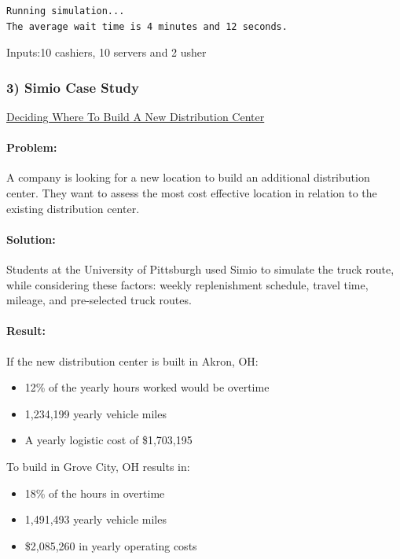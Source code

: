 \documentclass[
  11pt,
]{article}
\let\oldparagraph\paragraph
\renewcommand{\paragraph}[1]{\oldparagraph{#1}\mbox{}}
\begin{document}
\begin{verbatim}
Running simulation... 
The average wait time is 4 minutes and 12 seconds.
\end{verbatim}

Inputs:10 cashiers, 10 servers and 2 usher

\subsubsection{3) Simio Case Study}\label{simio-case-study}

\href{https://www.simio.com/projects/deciding-where-to-build-a-new-distribution-center/}{Deciding
Where To Build A New Distribution Center}

\paragraph{Problem:}\label{problem}

A company is looking for a new location to build an additional
distribution center. They want to assess the most cost effective
location in relation to the existing distribution center.

\paragraph{Solution:}\label{solution}

Students at the University of Pittsburgh used Simio to simulate the
truck route, while considering these factors: weekly replenishment
schedule, travel time, mileage, and pre-selected truck routes.

\paragraph{Result:}\label{result}

If the new distribution center is built in Akron, OH:

\begin{itemize}
\item
  12\% of the yearly hours worked would be overtime
\item
  1,234,199 yearly vehicle miles
\item
  A yearly logistic cost of \$1,703,195
\end{itemize}

To build in Grove City, OH results in:

\begin{itemize}
\item
  18\% of the hours in overtime
\item
  1,491,493 yearly vehicle miles
\item
  \$2,085,260 in yearly operating costs
\end{itemize}
\end{document}
